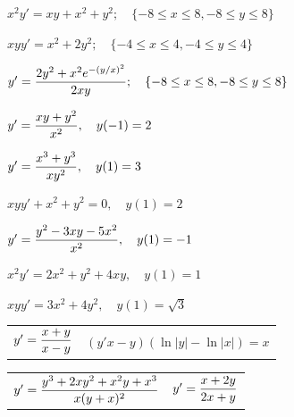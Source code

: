 \begin{exerciselist}

  \item\label{exer:2.4.19} \CGex $x^{2}y'=xy+x^{2}+y^{2};\quad\{-8\le x\le8,-8\le y\le8\}$

  \item\label{exer:2.4.20} \CGex $xyy'=x^{2}+2y^{2};\quad\{-4\le x\le4,-4\le y\le4\}$

  \item\label{exer:2.4.21} \CGex
        $y'=\displaystyle\frac{2y^{2}+x^{2}e^{-(y/x)^{2}}}{2xy}; \quad\{-8\le x\le8,-8\le y\le8\}$


  \item\label{exer:2.4.22} $y'=\displaystyle\frac{xy+y^{2}}{x^{2}}, \quad y(-1)=2$

  \item\label{exer:2.4.23} $y'=\displaystyle\frac{x^{3}+y^{3}}{xy^{2}},\quad y(1)=3$

  \item\label{exer:2.4.24} $xyy'+x^{2}+y^{2}=0,\quad y(1)=2$

  \item\label{exer:2.4.25} $y'=\displaystyle\frac{y^{2}-3xy-5x^{2}}{x^{2}},\quad y(1)=-1$

  \item\label{exer:2.4.26} $x^{2}y'=2x^{2}+y^{2}+4xy,\quad y(1)=1$

  \item\label{exer:2.4.27} $xyy'=3x^{2}+4y^{2},\quad y(1)=\sqrt{3}$


  \begin{tabular}[t]{@{}p{168pt}@{}p{168pt}}
    \item\label{exer:2.4.28} $y'=\displaystyle\frac{x+y}{x-y}$ &
    \item\label{exer:2.4.29}\vspace*{13pt} $(y'x-y)(\ln|y|-\ln|x|)=x$
  \end{tabular}

  \begin{tabular}[t]{@{}p{168pt}@{}p{168pt}}
    \item\label{exer:2.4.30} $y'=\displaystyle\frac{y^{3}+2xy^{2}+x^{2}y+x^{3}}{x(y+x)^{2}}$ &
    \item\label{exer:2.4.31} $y'=\displaystyle\frac{x+2y}{2x+y}$
  \end{tabular}


\end{exerciselist}
